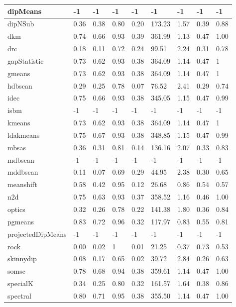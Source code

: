 \begin{table}[H]
\begin{tabular}{|l|l|l|l|l|l|l|l|l|}
\hline
dipMeans & -1 & -1 & -1 & -1 & -1 & -1 & -1 & -1 \\
\hline
dipNSub & 0.36 & 0.38 & 0.80 & 0.20 & 173.23 & 1.57 & 0.39 & 0.88 \\
\hline
dkm & 0.74 & 0.66 & 0.93 & 0.39 & 361.99 & 1.13 & 0.47 & 1.00 \\
\hline
drc & 0.18 & 0.11 & 0.72 & 0.24 & 99.51 & 2.24 & 0.31 & 0.78 \\
\hline
gapStatistic & 0.73 & 0.62 & 0.93 & 0.38 & 364.09 & 1.14 & 0.47 & 1 \\
\hline
gmeans & 0.73 & 0.62 & 0.93 & 0.38 & 364.09 & 1.14 & 0.47 & 1 \\
\hline
hdbscan & 0.29 & 0.25 & 0.78 & 0.07 & 76.52 & 2.41 & 0.29 & 0.74 \\
\hline
idec & 0.75 & 0.66 & 0.93 & 0.38 & 345.05 & 1.15 & 0.47 & 0.99 \\
\hline
isbm & -1 & -1 & -1 & -1 & -1 & -1 & -1 & -1 \\
\hline
kmeans & 0.73 & 0.62 & 0.93 & 0.38 & 364.09 & 1.14 & 0.47 & 1 \\
\hline
ldakmeans & 0.75 & 0.67 & 0.93 & 0.38 & 348.85 & 1.15 & 0.47 & 0.99 \\
\hline
mbsas & 0.36 & 0.31 & 0.81 & 0.14 & 136.16 & 2.07 & 0.33 & 0.83 \\
\hline
mdbscan & -1 & -1 & -1 & -1 & -1 & -1 & -1 & -1 \\
\hline
mddbscan & 0.11 & 0.07 & 0.69 & 0.29 & 44.95 & 2.38 & 0.30 & 0.65 \\
\hline
meanshift & 0.58 & 0.42 & 0.95 & 0.12 & 26.68 & 0.86 & 0.54 & 0.57 \\
\hline
n2d & 0.75 & 0.63 & 0.93 & 0.37 & 358.52 & 1.16 & 0.46 & 1.00 \\
\hline
optics & 0.32 & 0.26 & 0.78 & 0.22 & 141.38 & 1.80 & 0.36 & 0.84 \\
\hline
pgmeans & 0.83 & 0.72 & 0.96 & 0.32 & 117.97 & 0.83 & 0.55 & 0.81 \\
\hline
projectedDipMeans & -1 & -1 & -1 & -1 & -1 & -1 & -1 & -1 \\
\hline
rock & 0.00 & 0.02 & 1 & 0.01 & 21.25 & 0.37 & 0.73 & 0.53 \\
\hline
skinnydip & 0.08 & 0.17 & 0.65 & 0.02 & 39.72 & 2.84 & 0.26 & 0.63 \\
\hline
somsc & 0.78 & 0.68 & 0.94 & 0.38 & 359.61 & 1.14 & 0.47 & 1.00 \\
\hline
specialK & 0.34 & 0.25 & 0.80 & 0.32 & 161.57 & 1.64 & 0.38 & 0.86 \\
\hline
spectral & 0.80 & 0.71 & 0.95 & 0.38 & 355.50 & 1.14 & 0.47 & 1.00 \\

\end{tabular}
\end{table}

